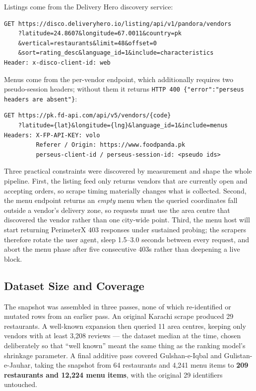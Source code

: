 \documentclass[11pt,a4paper]{article}
\newcommand{\code}[1]{\texttt{\small #1}}
\begin{document}
Listings come from the Delivery Hero discovery service:

\begin{lstlisting}[caption={Listing endpoint. \texttt{sort=rating\_desc} reproduces the site's ``Top rated'' ordering.}]
GET https://disco.deliveryhero.io/listing/api/v1/pandora/vendors
    ?latitude=24.8607&longitude=67.0011&country=pk
    &vertical=restaurants&limit=48&offset=0
    &sort=rating_desc&language_id=1&include=characteristics
Header: x-disco-client-id: web
\end{lstlisting}

Menus come from the per-vendor endpoint, which additionally requires two
pseudo-session headers; without them it returns
\code{HTTP 400 \{"error":"perseus headers are absent"\}}:

\begin{lstlisting}[caption={Menu endpoint and its required headers.}]
GET https://pk.fd-api.com/api/v5/vendors/{code}
    ?latitude={lat}&longitude={lng}&language_id=1&include=menus
Headers: X-FP-API-KEY: volo
         Referer / Origin: https://www.foodpanda.pk
         perseus-client-id / perseus-session-id: <pseudo ids>
\end{lstlisting}

Three practical constraints were discovered by measurement and shape the whole
pipeline. First, the listing feed only returns vendors that are currently open
and accepting orders, so scrape timing materially changes what is collected.
Second, the menu endpoint returns an \emph{empty} menu when the queried
coordinates fall outside a vendor's delivery zone, so requests must use the
area centre that discovered the vendor rather than one city-wide point. Third,
the menu host will start returning PerimeterX 403 responses under sustained
probing; the scrapers therefore rotate the user agent, sleep 1.5--3.0 seconds
between every request, and abort the menu phase after five consecutive 403s
rather than deepening a live block.

\subsection{Dataset Size and Coverage}

The snapshot was assembled in three passes, none of which re-identified or
mutated rows from an earlier pass. An original Karachi scrape produced 29
restaurants. A well-known expansion then queried 11 area centres, keeping only
vendors with at least 3{,}208 reviews --- the dataset median at the time,
chosen deliberately so that ``well known'' meant the same thing as the ranking
model's shrinkage parameter. A final additive pass covered Gulshan-e-Iqbal and
Gulistan-e-Jauhar, taking the snapshot from 64 restaurants and 4{,}241 menu
items to \textbf{209 restaurants and 12{,}224 menu items}, with the original 29
identifiers untouched.
\end{document}
